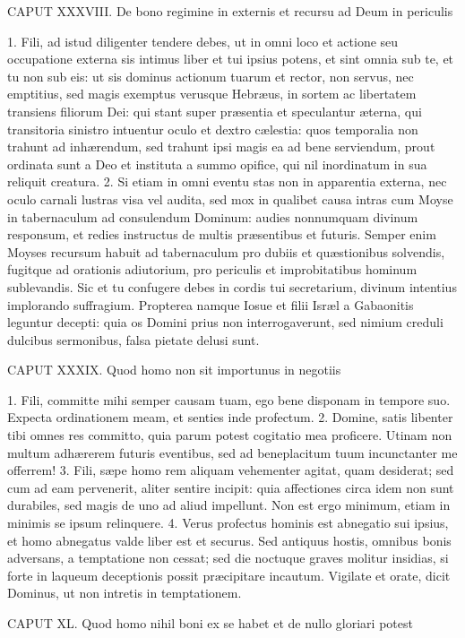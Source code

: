 CAPUT XXXVIII.
De bono regimine in externis et recursu ad Deum in periculis

1. Fili, ad istud diligenter tendere debes, ut in omni loco et actione seu occupatione externa sis intimus liber et tui ipsius potens, et sint omnia sub te, et tu non sub eis: ut sis dominus actionum tuarum et rector, non servus, nec emptitius, sed magis exemptus verusque Hebræus, in sortem ac libertatem transiens filiorum Dei: qui stant super præsentia et speculantur æterna, qui transitoria sinistro intuentur oculo et dextro cælestia: quos temporalia non trahunt ad inhærendum, sed trahunt ipsi magis ea ad bene serviendum, prout ordinata sunt a Deo et instituta a summo opifice, qui nil inordinatum in sua reliquit creatura.
2. Si etiam in omni eventu stas non in apparentia externa, nec oculo carnali lustras visa vel audita, sed mox in qualibet causa intras cum Moyse in tabernaculum ad consulendum Dominum: audies nonnumquam divinum responsum, et redies instructus de multis præsentibus et futuris. Semper enim Moyses recursum habuit ad tabernaculum pro dubiis et quæstionibus solvendis, fugitque ad orationis adiutorium, pro periculis et improbitatibus hominum sublevandis. Sic et tu confugere debes in cordis tui secretarium, divinum intentius implorando suffragium. Propterea namque Iosue et filii Isræl a Gabaonitis leguntur decepti: quia os Domini prius non interrogaverunt, sed nimium creduli dulcibus sermonibus, falsa pietate delusi sunt.


CAPUT XXXIX.
Quod homo non sit importunus in negotiis

1. Fili, committe mihi semper causam tuam, ego bene disponam in tempore suo. Expecta ordinationem meam, et senties inde profectum.
2. Domine, satis libenter tibi omnes res committo, quia parum potest cogitatio mea proficere. Utinam non multum adhærerem futuris eventibus, sed ad beneplacitum tuum incunctanter me offerrem!
3. Fili, sæpe homo rem aliquam vehementer agitat, quam desiderat; sed cum ad eam pervenerit, aliter sentire incipit: quia affectiones circa idem non sunt durabiles, sed magis de uno ad aliud impellunt. Non est ergo minimum, etiam in minimis se ipsum relinquere.
4. Verus profectus hominis est abnegatio sui ipsius, et homo abnegatus valde liber est et securus. Sed antiquus hostis, omnibus bonis adversans, a temptatione non cessat; sed die noctuque graves molitur insidias, si forte in laqueum deceptionis possit præcipitare incautum. Vigilate et orate, dicit Dominus, ut non intretis in temptationem.


CAPUT XL.
Quod homo nihil boni ex se habet et de nullo gloriari potest

